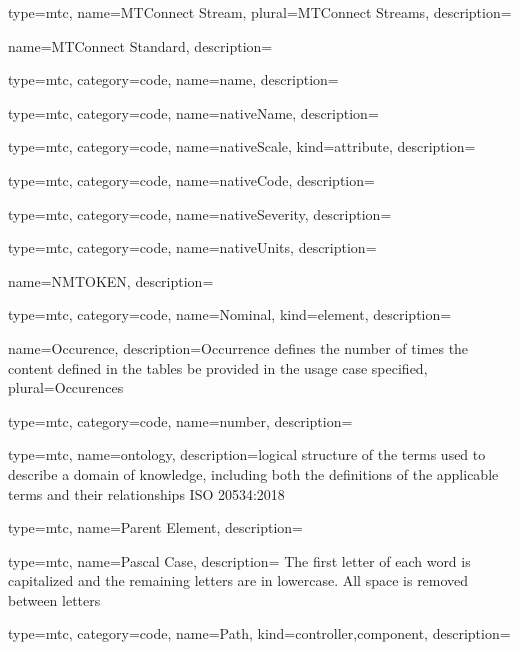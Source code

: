 {
  type=mtc,
  name={MTConnect Stream},
  plural={MTConnect Streams},
  description={}
}


{
  name={MTConnect Standard},
  description={}
}


{
  type=mtc,
  category=code,
  name={name},
  description={}
}


{
  type=mtc,
  category=code,
  name={nativeName},
  description={}
}


{
  type=mtc,
  category=code,
  name={nativeScale},
  kind={attribute},
  description={}
}


{
  type=mtc,
  category=code,
  name={nativeCode},
  description={}
}


{
  type=mtc,
  category=code,
  name={nativeSeverity},
  description={}
}


{
  type=mtc,
  category=code,
  name={nativeUnits},
  description={}
}


{
  name={NMTOKEN},
  description={}
}


{
  type=mtc,
  category=code,
  name={Nominal},
  kind={element},
  description={}
}


{
  name={Occurence},
  description={Occurrence defines the number of times the content defined in the tables \MAY be provided in the usage case specified},
  plural={Occurences}
}


{
  type=mtc,
  category=code,
  name={number},
  description={}
}


{
  type=mtc,
  name=ontology,
  description={logical structure of the terms used to describe a domain of knowledge, including both the definitions of the applicable terms and their relationships ISO 20534:2018}
}


{
  type=mtc,
  name={Parent Element},
  description={}
}


{
  type=mtc,
  name={Pascal Case},
  description= {The first letter of each word is capitalized and the remaining letters are in lowercase. All space is removed between letters}
}


{
  type=mtc,
  category=code,
  name={Path},
  kind={controller,component},
  description= {}
}


